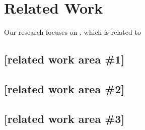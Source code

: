 \section{Related Work}
Our research focuses on \xxx, which is related to \xxx

\subsection{[related work area \#1]}

\subsection{[related work area \#2]}

\subsection{[related work area \#3]}